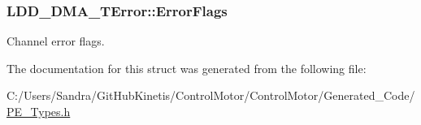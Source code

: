 \subsubsection[{\texorpdfstring{Error\+Flags}{ErrorFlags}}]{ L\+D\+D\+\_\+\+D\+M\+A\+\_\+\+T\+Error\+::\+Error\+Flags}\hypertarget{struct_l_d_d___d_m_a___t_error_a9dd0a645e1763b4daa0058b1b29c4ad7}{}\label{struct_l_d_d___d_m_a___t_error_a9dd0a645e1763b4daa0058b1b29c4ad7}
Channel error flags. 

The documentation for this struct was generated from the following file\+:\begin{DoxyCompactItemize}
\item 
C\+:/\+Users/\+Sandra/\+Git\+Hub\+Kinetis/\+Control\+Motor/\+Control\+Motor/\+Generated\+\_\+\+Code/\hyperlink{_p_e___types_8h}{P\+E\+\_\+\+Types.\+h}\end{DoxyCompactItemize}
